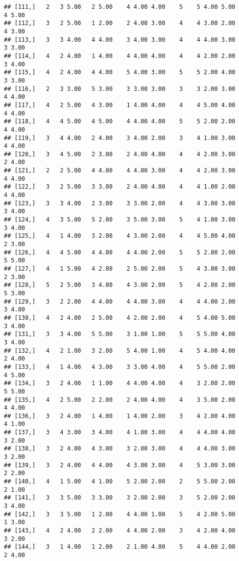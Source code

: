 \documentclass[]{article}
\begin{document}
\begin{verbatim}
## [111,]   2   3 5.00   2 5.00    4 4.00 4.00    5    5 4.00 5.00    4 5.00
## [112,]   3   2 5.00   1 2.00    2 4.00 3.00    4    4 3.00 2.00    4 3.00
## [113,]   3   3 4.00   4 4.00    3 4.00 3.00    4    4 4.00 3.00    3 3.00
## [114,]   4   2 4.00   1 4.00    4 4.00 4.00    4    4 2.00 2.00    3 4.00
## [115,]   4   2 4.00   4 4.00    5 4.00 3.00    5    5 2.00 4.00    3 3.00
## [116,]   2   3 3.00   5 3.00    3 3.00 3.00    3    3 2.00 3.00    4 4.00
## [117,]   4   2 5.00   4 3.00    1 4.00 4.00    4    4 5.00 4.00    4 4.00
## [118,]   4   4 5.00   4 5.00    4 4.00 4.00    5    5 2.00 2.00    4 4.00
## [119,]   3   4 4.00   2 4.00    3 4.00 2.00    3    4 1.00 3.00    4 4.00
## [120,]   3   4 5.00   2 3.00    2 4.00 4.00    4    4 2.00 3.00    2 4.00
## [121,]   2   2 5.00   4 4.00    4 4.00 3.00    4    4 2.00 3.00    4 4.00
## [122,]   3   2 5.00   3 3.00    2 4.00 4.00    4    4 1.00 2.00    4 4.00
## [123,]   3   3 4.00   2 3.00    3 3.00 2.00    4    4 3.00 3.00    3 4.00
## [124,]   4   3 5.00   5 2.00    3 5.00 3.00    5    4 1.00 3.00    3 4.00
## [125,]   4   1 4.00   3 2.00    4 3.00 2.00    4    4 5.00 4.00    2 3.00
## [126,]   4   4 5.00   4 4.00    4 4.00 2.00    5    5 2.00 2.00    5 5.00
## [127,]   4   1 5.00   4 2.00    2 5.00 2.00    5    4 3.00 3.00    2 3.00
## [128,]   5   2 5.00   3 4.00    4 3.00 2.00    5    4 2.00 2.00    5 3.00
## [129,]   3   2 2.00   4 4.00    4 4.00 3.00    4    4 4.00 2.00    3 4.00
## [130,]   4   2 4.00   2 5.00    4 2.00 2.00    4    5 4.00 5.00    3 4.00
## [131,]   3   3 4.00   5 5.00    3 1.00 1.00    5    5 5.00 4.00    3 4.00
## [132,]   4   2 1.00   3 2.00    5 4.00 1.00    4    5 4.00 4.00    2 4.00
## [133,]   4   1 4.00   4 3.00    3 3.00 4.00    4    5 5.00 2.00    4 5.00
## [134,]   3   2 4.00   1 1.00    4 4.00 4.00    4    3 2.00 2.00    5 5.00
## [135,]   4   2 5.00   2 2.00    2 4.00 4.00    4    3 5.00 2.00    4 4.00
## [136,]   3   2 4.00   1 4.00    1 4.00 2.00    3    4 2.00 4.00    4 1.00
## [137,]   3   4 3.00   3 4.00    4 1.00 3.00    4    4 4.00 4.00    3 2.00
## [138,]   3   2 4.00   4 3.00    3 2.00 3.00    4    4 4.00 3.00    3 2.00
## [139,]   3   2 4.00   4 4.00    4 3.00 3.00    4    5 3.00 3.00    2 2.00
## [140,]   4   1 5.00   4 1.00    5 2.00 2.00    2    5 5.00 2.00    2 1.00
## [141,]   3   3 5.00   3 3.00    3 2.00 2.00    3    5 2.00 2.00    3 4.00
## [142,]   3   3 5.00   1 2.00    4 4.00 1.00    5    4 2.00 5.00    1 3.00
## [143,]   4   2 4.00   2 2.00    4 4.00 2.00    3    4 2.00 4.00    3 2.00
## [144,]   3   1 4.00   1 2.00    2 1.00 4.00    5    4 4.00 2.00    2 4.00

\end{verbatim}
\end{document}

